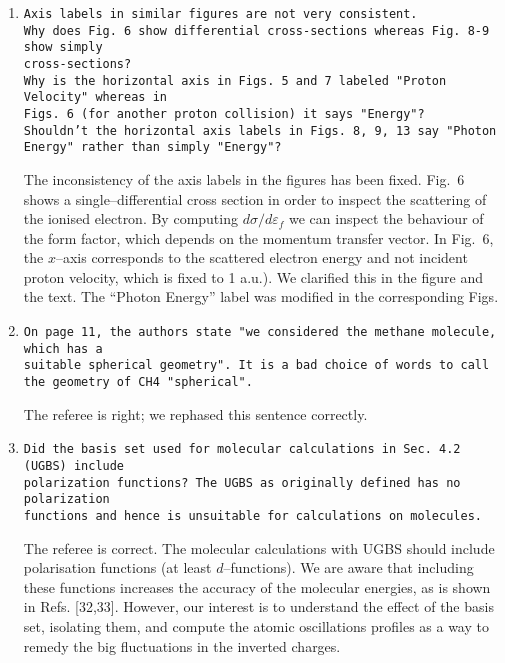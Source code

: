 \documentclass[10pt]{article}
\begin{document}
\begin{enumerate}
 \item {\tt Axis labels in similar figures are not very consistent.
 \\ Why does Fig.~6 show differential cross-sections whereas 
 Fig. 8-9 show simply \\ cross-sections? \\ Why is the horizontal
 axis in Figs.~5 and 7 labeled "Proton Velocity" whereas in \\
 Figs.~6 (for another proton collision) it says "Energy"? \\
 Shouldn't the horizontal axis labels in Figs. 8, 9, 13 say 
 "Photon Energy" rather than simply "Energy"?}
 
 The inconsistency of the axis labels in the figures has been 
 fixed. Fig.~6 shows a single--differential cross section in order 
 to inspect the scattering of the ionised electron. By computing 
 $d\sigma/d\varepsilon_{\!f}$ we can inspect the behaviour
 of the form factor, which depends on the momentum transfer 
 vector. In Fig.~6, the $x$--axis corresponds to the scattered
 electron energy and not incident proton velocity, which is fixed
 to 1 a.u.). We clarified this in the figure and the text. The
 ``Photon Energy'' label was modified in the corresponding Figs.
 
 \item {\tt On page 11, the authors state "we considered the
 methane molecule, which has a \\ suitable spherical geometry". 
 It is a bad choice of words to call the geometry of CH4
 "spherical".}
 
 The referee is right; we rephased this sentence correctly.
 
 \item {\tt Did the basis set used for molecular calculations in
 Sec. 4.2 (UGBS) include \\ polarization functions? The UGBS as 
 originally defined has no polarization \\ functions and hence is 
 unsuitable for calculations on molecules.}
 
 The referee is correct. The molecular calculations 
 with UGBS should include polarisation functions (at least 
 $d$--functions). We are aware that including these functions increases the accuracy of the molecular energies, as is shown in Refs. [32,33].
 However, our interest is to understand the effect of the basis set,
 isolating them, and compute the atomic oscillations profiles as a way 
 to remedy the big fluctuations in the inverted charges.
 

\end{enumerate}
\end{document}
